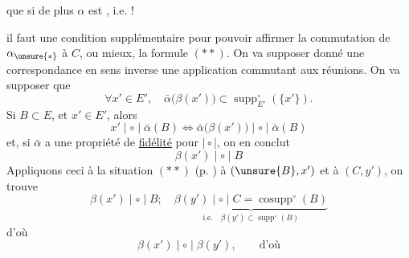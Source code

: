 que si de plus $\alpha$ est , i.e. !

 il faut une condition supplémentaire pour pouvoir affirmer la commutation de $\alpha_{\unsure{*}}$ à $C$, ou mieux, la formule $(**)$. On va supposer donné une correspondance en sens inverse
 une application
commutant aux réunions. On va supposer que
\[
\forall x'\in E',\quad \bar\alpha\bigl(\beta(x')\bigr)\subset\operatorname{supp}^{\circ}_{E'}(\{x'\}). \tag*{$(*)$}
\]
Si $B\subset E$,  et $x'\in E'$, alors
\[
x'\mid\circ\mid\bar\alpha(B)\Longleftrightarrow\bar\alpha\bigl(\beta(x')\bigr)\mid\circ\mid\bar\alpha(B)
\]
et, si $\bar\alpha$ a une propriété de \uline{fidélité} pour $\mid\circ\mid$, on en conclut
\[
\beta(x')\mid\circ\mid B
\]
Appliquons ceci à la situation $(**)$ (p. ) à $(\unsure{B},x')$ et à $(C,y')$, on trouve
\[
\beta(x')\mid\circ\mid B;\quad
\underbrace{\beta(y')\mid\circ\mid C=\operatorname{cosupp}^{\circ}(B)}_{\text{i.e.}\quad\beta(y')\subset\operatorname{supp}^{\circ}(B)}
\]
d'où
\[
\beta(x')\mid\circ\mid\beta(y'),\qquad\text{d'où}
\]
